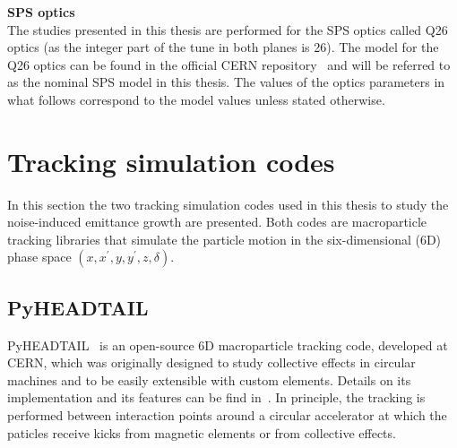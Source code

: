 \textbf{SPS optics}\\
The studies presented in this thesis are performed for the SPS optics called Q26 optics (as the integer part of the tune in both planes is 26). The model for the Q26 optics can be found in the official CERN repository~\cite{SPS_optics_repo} and will be referred to as the nominal SPS model in this thesis. The values of the optics parameters in what follows correspond to the model values unless stated otherwise.
\normalsize{\textbf{} %



\section{Tracking simulation codes}\label{sec:simualtion_codes}
In this section the two tracking simulation codes used in this thesis to study the noise-induced emittance growth are presented. Both codes are macroparticle tracking libraries that simulate the particle motion in the six-dimensional (6D) phase space $(x, x^\prime, y, y^\prime, z, \delta)$. 




\subsection{PyHEADTAIL}\label{subsec:pyheadtail}

PyHEADTAIL~\cite{pyheadtail_repository} is an open-source 6D macroparticle tracking code, developed at CERN, which was originally designed to study collective effects in circular machines and to be easily extensible with custom elements. 
Details on its implementation and its features can be find in~\cite{pyheadtail_manual_adrian, pyheadtail_schenk}. In principle, the tracking is performed between interaction points around a circular accelerator at which the paticles receive kicks from magnetic elements or from collective effects. 


}
